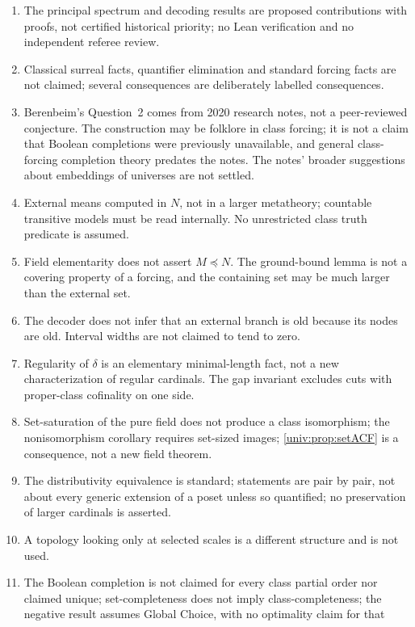 \documentclass[11pt,letterpaper]{article}
\numberwithin{equation}{section}
\theoremstyle{definition}
\theoremstyle{remark}
\begin{document}
\begin{enumerate}[label=01.\arabic*,leftmargin=3.2em]
\item The principal spectrum and decoding results are proposed contributions
with proofs, not certified historical priority; no Lean verification and no
independent referee review.
\item Classical surreal facts, quantifier elimination and standard forcing facts
are not claimed; several consequences are deliberately labelled consequences.
\item Berenbeim's Question~2 comes from 2020 research notes, not a peer-reviewed
conjecture. The construction may be folklore in class forcing; it is not a
claim that Boolean completions were previously unavailable, and general
class-forcing completion theory predates the notes. The notes' broader
suggestions about embeddings of universes are not settled.
\item External means computed in $N$, not in a larger metatheory; countable
transitive models must be read internally. No unrestricted class truth
predicate is assumed.
\item Field elementarity does not assert $M\preccurlyeq N$. The ground-bound
lemma is not a covering property of a forcing, and the containing set may be
much larger than the external set.
\item The decoder does not infer that an external branch is old because its
nodes are old. Interval widths are not claimed to tend to zero.
\item Regularity of $\delta$ is an elementary minimal-length fact, not a new
characterization of regular cardinals. The gap invariant excludes cuts with
proper-class cofinality on one side.
\item Set-saturation of the pure field does not produce a class isomorphism;
the nonisomorphism corollary requires set-sized images;
\cref{univ:prop:setACF} is a consequence, not a new field theorem.
\item The distributivity equivalence is standard; statements are pair by pair,
not about every generic extension of a poset unless so quantified; no
preservation of larger cardinals is asserted.
\item A topology looking only at selected scales is a different structure and
is not used.
\item The Boolean completion is not claimed for every class partial order nor
claimed unique; set-completeness does not imply class-completeness; the
negative result assumes Global Choice, with no optimality claim for that

\end{enumerate}
\end{document}
